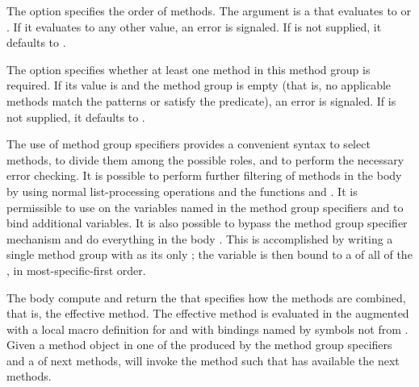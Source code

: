 \itemitem{\bull}
The  option specifies the order of methods.  The 
argument is a  that evaluates to 
 or .  If it evaluates
to any other value, an error is signaled.  
If  is not supplied, it defaults to 
.
                                 
\itemitem{\bull}
The  option specifies whether at least one method in
this method group is required.
If its value is  and the method group is empty 
(that is, no applicable methods match the  patterns
or satisfy the predicate), 
an error is signaled.  
If  is not supplied,
it defaults to \nil.  
 
\endlist
 
The use of method group specifiers provides a convenient syntax to
select methods, to divide them among the possible roles, and to perform the
necessary error checking.  It is possible to perform further filtering
of methods in the body  by using normal list-processing operations
and the functions  and 
.  It is permissible to use  on the
variables named in the method group specifiers and to bind additional
variables.  It is also possible to bypass the method group specifier
mechanism and do everything in the body .  This is accomplished
by writing a single method group with \misc{*} as its only 
; 
the variable is then bound to a  of all of the
, in most-specific-first order.
 
 
The body  compute and return the  that specifies
how the methods are combined, that is, the effective method.
The effective method is evaluated in
the  augmented with a local macro definition
for  and with bindings named by
symbols not  from .
Given a method object in one of the 
 produced by the method group
specifiers and a  of next methods,
will invoke the method such that  has available
the next methods.
 
